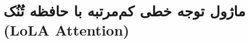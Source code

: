 \section{ماژول توجه خطی کم‌مرتبه با حافظه تُنُک (LoLA Attention)}
\label{sec:module_lola_attention}
